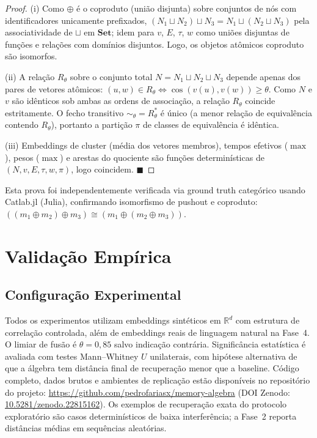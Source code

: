 \documentclass[11pt,a4paper]{article}
\theoremstyle{definition}
\begin{document}
\begin{proof}
(i) Como $\oplus$ \'e o coproduto (uni\~ao disjunta) sobre conjuntos de n\'os com identificadores unicamente prefixados, $(N_1 \sqcup N_2) \sqcup N_3 = N_1 \sqcup (N_2 \sqcup N_3)$ pela associatividade de $\sqcup$ em $\mathbf{Set}$; idem para $v$, $E$, $\tau$, $w$ como uni\~oes disjuntas de fun\c{c}\~oes e rela\c{c}\~oes com dom\'inios disjuntos. Logo, os objetos at\^omicos coproduto s\~ao isomorfos.

(ii) A rela\c{c}\~ao $R_\theta$ sobre o conjunto total $N = N_1 \sqcup N_2 \sqcup N_3$ depende apenas dos pares de vetores at\^omicos: $(u, w) \in R_\theta \iff \cos(v(u), v(w)) \geq \theta$. Como $N$ e $v$ s\~ao id\^enticos sob ambas as ordens de associa\c{c}\~ao, a rela\c{c}\~ao $R_\theta$ coincide estritamente. O fecho transitivo $\sim_\theta = R_\theta^*$ \'e \'unico (a menor rela\c{c}\~ao de equival\^encia contendo $R_\theta$), portanto a parti\c{c}\~ao $\pi$ de classes de equival\^encia \'e id\^entica.

(iii) Embeddings de cluster (m\'edia dos vetores membros), tempos efetivos ($\max$), pesos ($\max$) e arestas do quociente s\~ao fun\c{c}\~oes determin\'isticas de $(N, v, E, \tau, w, \pi)$, logo coincidem. $\blacksquare$
\end{proof}

Esta prova foi independentemente verificada via ground truth categ\'orico usando Catlab.jl (Julia), confirmando isomorfismo de pushout e coproduto: $((m_1 \oplus m_2) \oplus m_3) \cong (m_1 \oplus (m_2 \oplus m_3))$.

\section{Valida\c{c}\~ao Emp\'irica}\label{sec:empirico}

\subsection{Configura\c{c}\~ao Experimental}

Todos os experimentos utilizam embeddings sint\'eticos em $\mathbb{R}^d$ com estrutura de correla\c{c}\~ao controlada, al\'em de embeddings reais de linguagem natural na Fase~4. O limiar de fus\~ao \'e $\theta = 0{,}85$ salvo indica\c{c}\~ao contr\'aria. Signific\^ancia estat\'istica \'e avaliada com testes Mann--Whitney $U$ unilaterais, com hip\'otese alternativa de que a \'algebra tem dist\^ancia final de recupera\c{c}\~ao menor que a baseline. C\'odigo completo, dados brutos e ambientes de replica\c{c}\~ao est\~ao dispon\'iveis no reposit\'orio do projeto: \url{https://github.com/pedrofariasx/memory-algebra} (DOI Zenodo: \href{https://doi.org/10.5281/zenodo.22815162}{10.5281/zenodo.22815162}). Os exemplos de recupera\c{c}\~ao exata do protocolo explorat\'orio s\~ao casos determin\'isticos de baixa interfer\^encia; a Fase~2 reporta dist\^ancias m\'edias em sequ\^encias aleat\'orias.
\end{document}
